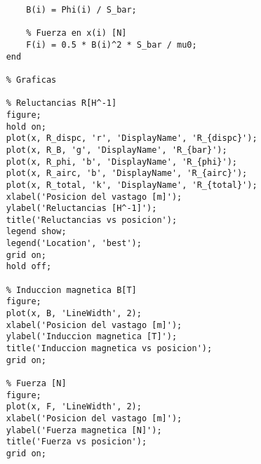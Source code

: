 \begin{lstlisting}[style=Matlab-editor]
        % Induccion magnetica [T]
        B(i) = Phi(i) / S_bar;

        % Fuerza en x(i) [N]
        F(i) = 0.5 * B(i)^2 * S_bar / mu0;
    end

    % Graficas

    % Reluctancias R[H^-1]
    figure;
    hold on;
    plot(x, R_dispc, 'r', 'DisplayName', 'R_{dispc}');
    plot(x, R_B, 'g', 'DisplayName', 'R_{bar}');
    plot(x, R_phi, 'b', 'DisplayName', 'R_{phi}');
    plot(x, R_airc, 'b', 'DisplayName', 'R_{airc}');
    plot(x, R_total, 'k', 'DisplayName', 'R_{total}');
    xlabel('Posicion del vastago [m]');
    ylabel('Reluctancias [H^-1]');
    title('Reluctancias vs posicion');
    legend show;
    legend('Location', 'best');
    grid on;
    hold off;

    % Induccion magnetica B[T]
    figure;
    plot(x, B, 'LineWidth', 2);
    xlabel('Posicion del vastago [m]');
    ylabel('Induccion magnetica [T]');
    title('Induccion magnetica vs posicion');
    grid on;

    % Fuerza [N]
    figure;
    plot(x, F, 'LineWidth', 2);
    xlabel('Posicion del vastago [m]');
    ylabel('Fuerza magnetica [N]');
    title('Fuerza vs posicion');
    grid on;
\end{lstlisting}